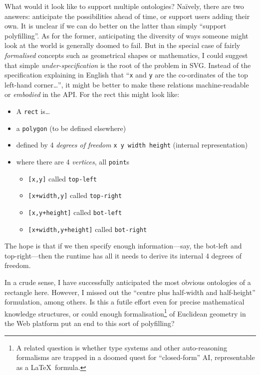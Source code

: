 What would it look like to support multiple ontologies? Naïvely, there
are two answers: anticipate the possibilities ahead of time, or support
users adding their own. It is unclear if we can do better on the latter
than simply ``support polyfilling''. As for the former, anticipating the
diversity of ways someone might look at the world is generally doomed to
fail. But in the special case of fairly \emph{formalised} concepts such
as geometrical shapes or mathematics, I could suggest that simple
\emph{under-specification} is the root of the problem in SVG. Instead of
the specification explaining in English that ``\texttt{x} and \texttt{y}
are the co-ordinates of the top left-hand corner\ldots{}'', it might be
better to make these relations machine-readable or \emph{embodied} in
the API. For the rect this might look like:

\begin{itemize}
\tightlist
\item
  A \texttt{rect} is\ldots{}
\item
  a \texttt{polygon} (to be defined elsewhere)
\item
  defined by 4 \emph{degrees of freedom} \texttt{x\ y\ width\ height}
  (internal representation)
\item
  where there are 4 \emph{vertices}, all \texttt{point}s

  \begin{itemize}
  \tightlist
  \item
    \texttt{{[}x,y{]}} called \texttt{top-left}
  \item
    \texttt{{[}x+width,y{]}} called \texttt{top-right}
  \item
    \texttt{{[}x,y+height{]}} called \texttt{bot-left}
  \item
    \texttt{{[}x+width,y+height{]}} called \texttt{bot-right}
  \end{itemize}
\end{itemize}

The hope is that if we then specify enough information---say, the
bot-left and top-right---then the runtime has all it needs to derive its
internal 4 degrees of freedom.

In a crude sense, I have successfully anticipated the most obvious
ontologies of a rectangle here. However, I missed out the ``centre plus
half-width and half-height'' formulation, among others. Is this a futile
effort even for precise mathematical knowledge structures, or could
enough formalisation\footnote{A related question is whether type systems
  and other auto-reasoning formalisms are trapped in a doomed quest for
  ``closed-form'' AI, representable as a \LaTeX~formula.} of Euclidean
geometry in the Web platform put an end to this sort of polyfilling?

